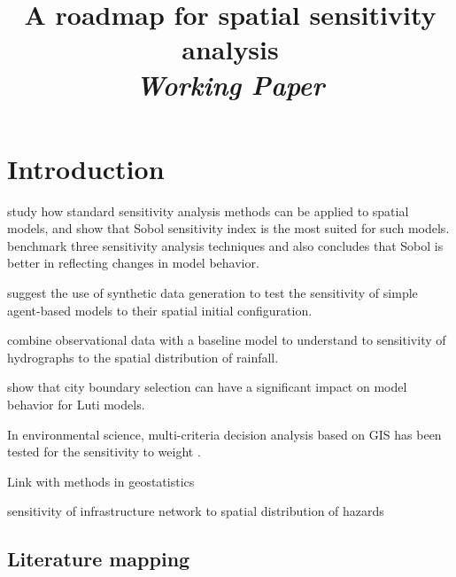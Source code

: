 


\title{A roadmap for spatial sensitivity analysis\bigskip\\
\textit{Working Paper}
}
\author{}
\date{}


\maketitle

\justify


\begin{abstract}

\end{abstract}





\section{Introduction}


\cite{lilburne2009sensitivity} study how standard sensitivity analysis methods can be applied to spatial models, and show that Sobol sensitivity index is the most suited for such models. \cite{saint2010comparison} benchmark three sensitivity analysis techniques and also concludes that Sobol is better in reflecting changes in model behavior.

\cite{cottineau2017initial} suggest the use of synthetic data generation to test the sensitivity of simple agent-based models to their spatial initial configuration.

\cite{obled1994sensitivity} combine observational data with a baseline model to understand to sensitivity of hydrographs to the spatial distribution of rainfall.


\cite{Thomasetal2017} show that city boundary selection can have a significant impact on model behavior for Luti models.


In environmental science, multi-criteria decision analysis based on GIS has been tested for the sensitivity to weight \cite{chen2010spatial}.


Link with methods in geostatistics \cite{gotway2002combining}

\cite{moderl2011spatial} sensitivity of infrastructure network to spatial distribution of hazards



\subsection{Literature mapping}

